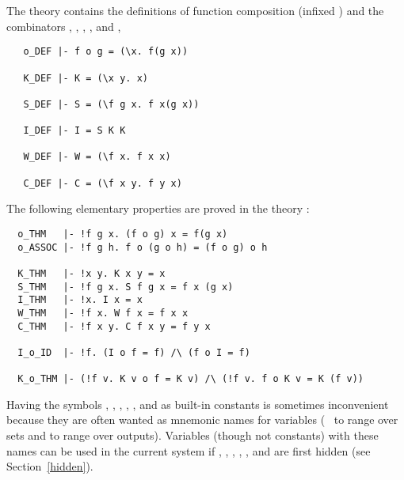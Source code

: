 The theory 
contains the definitions of function composition (infixed )
and the combinators
,
,
,
,
and ,

\begin{hol}
{\small
\begin{verbatim}
   o_DEF |- f o g = (\x. f(g x))

   K_DEF |- K = (\x y. x)

   S_DEF |- S = (\f g x. f x(g x))

   I_DEF |- I = S K K

   W_DEF |- W = (\f x. f x x)

   C_DEF |- C = (\f x y. f y x)
\end{verbatim}}
\end{hol}

\noindent The following elementary properties are proved in the theory
:

\begin{hol}
\begin{verbatim}
  o_THM   |- !f g x. (f o g) x = f(g x)
  o_ASSOC |- !f g h. f o (g o h) = (f o g) o h

  K_THM   |- !x y. K x y = x
  S_THM   |- !f g x. S f g x = f x (g x)
  I_THM   |- !x. I x = x
  W_THM   |- !f x. W f x = f x x
  C_THM   |- !f x y. C f x y = f y x

  I_o_ID  |- !f. (I o f = f) /\ (f o I = f)

  K_o_THM |- (!f v. K v o f = K v) /\ (!f v. f o K v = K (f v))
\end{verbatim}
\end{hol}

Having the symbols , , , , , and 
as built-in constants
is sometimes inconvenient because they are often wanted
as mnemonic names for variables (\eg\  to range over sets and
 to range over outputs).  Variables (though not constants) with
these names can be used in the current system if , , ,
, , and  are first hidden (see Section~\ref{hidden}).


